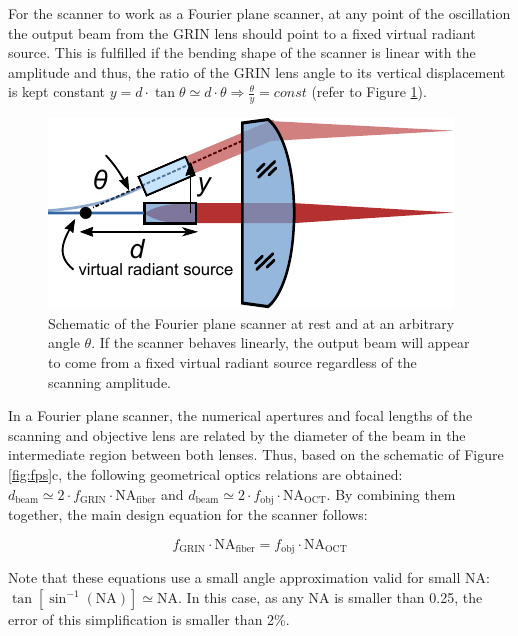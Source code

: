 For the scanner to work as a Fourier plane scanner, at any point of the oscillation the output beam from the GRIN lens should point to a fixed virtual radiant source. This is fulfilled if the bending shape of the scanner is linear with the amplitude and thus, the ratio of the GRIN lens angle to its vertical displacement is kept constant $ y = d \cdot \tan \theta \simeq d \cdot \theta \Rightarrow \frac{\theta}{y} = const $ (refer to Figure \ref{fig:radiant}).

\begin{figure}[h!]\centering
      \includegraphics{figures/30_DesignSimulation/Mechanical/radiant.pdf}
      \caption{Schematic of the Fourier plane scanner at rest and at an arbitrary angle $\theta$. If the scanner behaves linearly, the output beam will appear to come from a fixed virtual radiant source regardless of the scanning amplitude.}
      \label{fig:radiant}
\end{figure}


In a Fourier plane scanner, the numerical apertures and focal lengths of the scanning and objective lens are related by the diameter of the beam in the intermediate region between both lenses. Thus, based on the schematic of Figure \ref{fig:fps}c, the following geometrical optics relations are obtained: $d_\mathrm{beam} \simeq 2\cdot f_\mathrm{GRIN}\cdot \mathrm{NA}_\mathrm{fiber}$ and $d_\mathrm{beam} \simeq 2 \cdot f_\mathrm{obj}\cdot \mathrm{NA}_\mathrm{OCT}$. By combining them together, the main design equation for the scanner follows:

\begin{equation}
f_\mathrm{GRIN} \cdot \mathrm{NA}_\mathrm{fiber} = f_\mathrm{obj} \cdot \mathrm{NA}_\mathrm{OCT}
\label{eq:fpsNA}
\end{equation}

Note that these equations use a small angle approximation valid for small NA: \\ $\tan[	\sin^{-1}(\mathrm{NA})] \simeq \mathrm{NA} $. In this case, as any NA is smaller than 0.25, the error of this simplification is smaller than 2\%.

